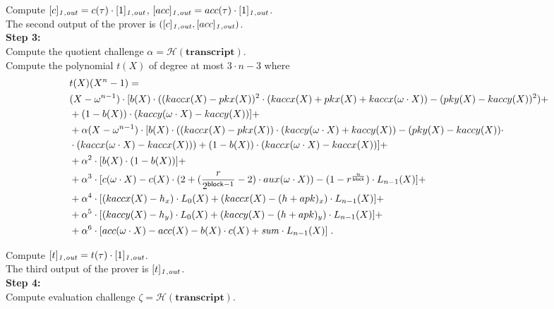 \noindent Compute $[c]_{\mathit{1,out}} = c(\tau) \cdot [1]_{\mathit{1,out}}$, $[acc]_{\mathit{1,out}} = acc(\tau) \cdot [1]_{\mathit{1,out}}$. \\

\noindent The second output of the prover is $([c]_{\mathit{1,out}}, [acc]_{\mathit{1,out}})$. \\

\noindent \textbf{Step 3:} \\
\noindent Compute the quotient challenge $\alpha = \mathcal{H}(\mathbf{transcript})$. \\

\noindent Compute the polynomial $t(X)$ of degree at most $3\cdot n - 3$  where 
\begin{align*}
&t(X)(X^n-1)  = \\  
&(X-\omega^{n-1}) \cdot [b(X) \cdot ((kaccx(X)-pkx(X))^2 \cdot (kaccx(X)+ pkx(X) + kaccx(\omega\cdot X)) - (pky(X)-kaccy(X))^2) + \\ 
& + (1-b(X))\cdot (kaccy(\omega\cdot X) - kaccy(X))] + \\
& +\alpha (X-\omega^{n-1})\cdot [b(X) \cdot ((kaccx(X) - pkx(X)) \cdot (kaccy(\omega \cdot X) + kaccy(X)) - (pky(X) - kaccy(X)) \cdot \\
&\cdot (kaccx(\omega \cdot X) - kaccx(X))) + (1-b(X)) \cdot (kaccx(\omega \cdot X) - kaccx(X))] + \\
& +\alpha^2 \cdot [b(X) \cdot (1-b(X))] + \\
& +\alpha^3 \cdot [c(\omega \cdot X) - c(X)\cdot (2+ (\frac{r}{2^{\mathsf{block} -1}} -2) \cdot aux(\omega \cdot X))- (1 - r^{\frac{n}{\mathsf{block}}}) \cdot L_{n-1}(X)] + \\ 
& +\alpha^4 \cdot [(kaccx(X) - h_x)\cdot L_0(X) + (kaccx(X) - (h + apk)_{x}) \cdot L_{n-1}(X)] + \\ 
& +\alpha^5 \cdot [(kaccy(X) - h_y)\cdot L_0(X) + (kaccy(X) - (h + apk)_{y}) \cdot L_{n-1}(X)] + \\
& +\alpha^6 \cdot [ acc(\omega \cdot X) - acc(X) - b(X)\cdot c(X) + \mathit{sum} \cdot L_{n-1}(X)] \; .
\end{align*}

\noindent Compute $[t]_{\mathit{1,out}} = t(\tau) \cdot [1]_{\mathit{1,out}}$.  \\

\noindent The third output of the prover is $[t]_{\mathit{1,out}}$. \\

\noindent \textbf{Step 4:} \\
\noindent Compute evaluation challenge $\zeta = \mathcal{H}(\mathbf{transcript})$. \\

